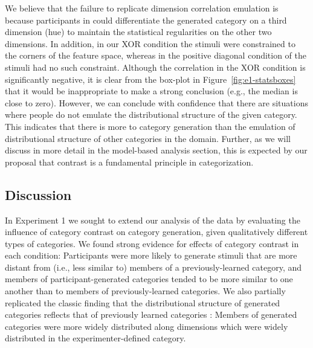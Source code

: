 \documentclass[12pt]{article}
\begin{document}
\begin{flushleft}
We believe that the failure to replicate dimension correlation emulation is
because participants in \cite{jern2013probabilistic} could differentiate the
generated category on a third dimension (hue) to maintain the statistical
regularities on the other two dimensions. In addition, in our XOR condition the
stimuli were constrained to the corners of the feature space, whereas in the
positive diagonal condition of \cite{jern2013probabilistic} the stimuli had no
such constraint. Although the correlation in the XOR condition is significantly
negative, it is clear from the box-plot in Figure~\ref{fig:e1-statsboxes} that
it would be inappropriate to make a strong conclusion (e.g., the median is close
to zero). However, we can conclude with confidence that there are situations
where people do not emulate the distributional structure of the given category.
This indicates that there is more to category generation than the emulation of
distributional structure of other categories in the domain. Further, as we will
discuss in more detail in the model-based analysis section, this is expected by
our proposal that contrast is a fundamental principle in categorization.


\subsection{Discussion} In Experiment 1 we sought to extend our analysis of the
\cite{jern2013probabilistic} data by evaluating the influence of category
contrast on category generation, given qualitatively different types of categories. We found strong evidence for effects of category contrast in each
condition: Participants were more likely to generate stimuli that are more
distant from (i.e., less similar to) members of a previously-learned category,
and members of participant-generated categories tended to be more similar to one
another than to members of previously-learned categories. We also partially
replicated the classic finding that the distributional structure of generated
categories reflects that of previously learned categories
\citep{jern2013probabilistic,ward1994structured}: Members of generated
categories were more widely distributed along dimensions which were widely
distributed in the experimenter-defined category.


\end{flushleft}
\end{document}
